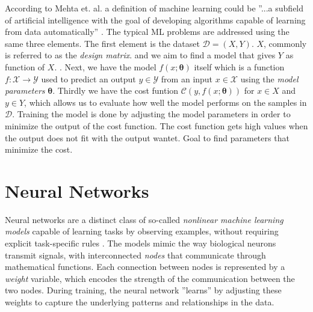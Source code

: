 \documentclass[a4paper, UKenglish, 11pt]{uiomaster}
\begin{document}
According to Mehta et. al. a definition of machine learning could be ''...a subfield of artificial intelligence with the goal of developing algorithms capable of learning from data automatically'' \cite{mehta2019high}. The typical ML problems are addressed using the same three elements.
The first element is the dataset $\mathcal{D} = (X, Y)$. $X$, commonly is referred to as the \emph{design matrix}. and we aim to find a model that gives $Y$ as function of $X$. .
Next, we have the model $f(x; \boldsymbol{\theta})$ itself which is a function $f : \mathcal X \to \mathcal Y$ used to predict an output $y \in \mathcal Y$ from an input $x \in \mathcal X$ using the \emph{model parameters} $\boldsymbol{\theta}$. 
Thirdly we have the cost funtion $\mathcal{C}(y, f(x; \boldsymbol{\theta}))$ for $x \in X$ and $y \in Y$, which allows us to evaluate how well the model performs on the samples in $\mathcal{D}$.
Training the model is done by adjusting the model parameters in order to minimize the output of the cost function. The cost function gets high values when the output does not fit with the output wantet. Goal to find parameters that minimize the cost. 

\section{Neural Networks}
Neural networks are a distinct class of so-called \emph{nonlinear machine learning models} capable of learning tasks by observing examples, without requiring explicit task-specific rules \cite{Hjorth-Jensen2022}. The models mimic the way biological neurons transmit signals, with interconnected \emph{nodes} that communicate through mathematical functions. Each connection between nodes is represented by a \emph{weight} variable, which encodes the strength of the communication between the two nodes. During training, the neural network ''learns'' by adjusting these weights to capture the underlying patterns and relationships in the data.
\end{document}
